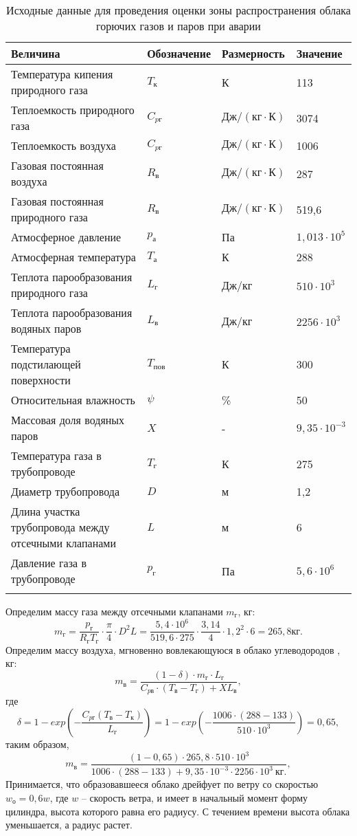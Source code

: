 \begin{longtable}{|p{4cm}|p{4cm}|p{4cm}|p{4cm}|}
	\hline
	\textbf{Величина} &
	\textbf{Обозначение} &
	\textbf{Размерность} &
	\textbf{Значение} \\ \hline
	\endhead

	Температура кипения природного газа & $T_к$ & К & 113 \\ \hline
	Теплоемкость природного газа & $C_{pг}$ & $Дж/(кг \cdot К)$ & 3074 \\ \hline
	Теплоемкость воздуха & $C_{pг}$ & $Дж/(кг \cdot К)$ & 1006 \\ \hline
	Газовая постоянная воздуха & $R_в$ & $Дж/(кг \cdot К)$ & 287 \\ \hline
	Газовая постоянная природного газа & $R_в$ & $Дж/(кг \cdot К)$ & 519,6 \\ \hline
	Атмосферное давление & $p_а$ & Па & $1,013 \cdot 10^5$ \\ \hline
	Атмосферная температура & $T_а$ & К & 288 \\ \hline
	Теплота парообразования природного газа & $L_г$ & Дж/кг & $510 \cdot 10^3$ \\ \hline
	Теплота парообразования водяных паров & $L_в$ & Дж/кг & $2256 \cdot 10^3$ \\ \hline
	Температура подстилающей поверхности & $T_{пов}$ & К & 300 \\ \hline
	Относительная влажность & $\psi$ & \% & 50 \\ \hline
	Массовая доля водяных паров & $X$ & - & $9,35 \cdot 10^{-3}$ \\ \hline
	Температура газа в трубопроводе & $T_г$ & К & 275 \\ \hline
	Диаметр трубопровода & $D$ & м & 1,2 \\ \hline
	Длина участка трубопровода между отсечными клапанами & $L$ & м & 6 \\ \hline
	Давление газа в трубопроводе & $p_г$ & Па & $5,6 \cdot 10^6$ \\ \hline
	\caption{Исходные данные для проведения оценки зоны распространения облака горючих газов и паров при аварии} \label{tab:ecology-cloud-input}
\end{longtable}

Определим массу газа между отсечными клапанами $m_г$, кг:
$$
m_г = \frac{
p_г
}{
R_г T_г
} \cdot \frac{\pi}{4} \cdot D^2 L = \frac{
5,4 \cdot 10^6
}{
519,6 \cdot 275
} \cdot \frac{3,14}{4} \cdot 1,2^2 \cdot 6 = 265,8 кг.
$$
Определим массу воздуха, мгновенно вовлекающуюся в облако углеводородов , кг:
$$
m_в = \frac{
(1 - \delta) \cdot m_г \cdot L_г
}{
C_{pв} \cdot (T_в - T_г) + XL_в
},
$$
где
$$
\delta = 1 - exp\left(
-\frac{
C_{pг}(T_в - T_к)
}{
L_г
}
\right) = 1 - exp\left(
-\frac{
1006 \cdot (288 - 133)
}{
510 \cdot 10^3
}
\right) = 0,65,
$$
таким образом,
$$
m_в = \frac{
(1 - 0,65) \cdot 265,8 \cdot 510 \cdot 10^3
}{
1006 \cdot (288 - 133) + 9,35 \cdot 10^{-3} \cdot 2256 \cdot 10^3 \ кг.
},
$$
Принимается, что образовавшееся облако дрейфует по ветру со скоростью $w_о = 0,6 w$, где $w$ – скорость ветра, и имеет в начальный момент форму цилиндра, высота которого равна его радиусу. С течением времени высота облака уменьшается, а радиус растет.

